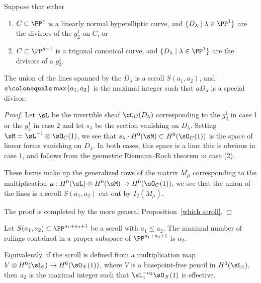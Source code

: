\begin{corollary}\label{hyperelliptic and trigonal} Suppose that 
either
\begin{enumerate}
\item  $C\subset \PP^r$ is a linearly normal hyperelliptic curve, and
$
\{D_\lambda \mid \lambda \in \PP^1\}
$
are the divisors of the 
%
$g^1_2$
on $C$, or

\item $C\subset \PP^{g-1}$ is a trigonal canonical curve, and
$\{D_\lambda \mid \lambda \in \PP^1\}$
are the divisors of a
%
$g^1_3$.
\end{enumerate}
%
The union of the lines spanned by the $D_\lambda$
is a scroll $S(a_1,a_2)$, and $a\colonequals  \max\{a_1, a_2\}$ is the
maximal integer such that
$aD_\lambda$ is a special divisor.
\end{corollary}

\begin{proof}
Let $\sL$ be the invertible sheaf $\cO_C(D_\lambda)$ corresponding to
the $g^1_2$ in case 1 or
the $g_3^1$ in case 2 and let $s_\lambda$ be
the section vanishing on $D_\lambda$. Setting $\sM =  \sL^{-1}\otimes
\sO_C(1)$, we see that
$s_\lambda\cdot H^0(\sM) \subset H^0(\sO_C(1))$ is the space of linear
forms vanishing on
$D_\lambda$. In both cases, this space is a line: this is obvious in
case 1, and follows from the
geometric Riemann--Roch theorem
%
 in case (2).

These forms make up the
generalized rows of the matrix $M_\mu$ corresponding to the multiplication
$\mu: H^0(\sL)\otimes H^0(\sM) \to H^0(\sO_C(	1))$, we see that the
union of the lines is a
scroll $S(a_1,a_2)$ cut out by $I_2(M_\mu)$.

The proof is completed by the more general Proposition~\ref{which scroll}.
\end{proof}

\begin{proposition}\label{which scroll}
Let $S(a_1,a_2)\subset \PP^{a_1+a_2+1}$ be a scroll with $a_1\leq
a_2$. The maximal number of rulings contained in
a proper subspace of $ \PP^{a_1+a_2+1}$ is $a_2$.

Equivalently, if the scroll is defined from a multiplication
map $V\otimes H^0(\sL_2) \to H^0(\sO_X(1))$, where $V$ is a basepoint-free
pencil in $H^0(\sL_1)$,
then $a_2$ is the maximal integer such that $\sL_1^{-a_2}\sO_X(1)$
is effective.
\unif
\end{proposition}

